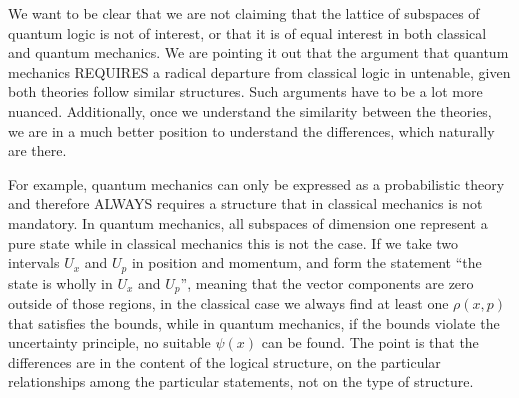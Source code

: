 \documentclass[11pt, executivepaper]{article}
\begin{document}
We want to be clear that we are not claiming that the lattice of subspaces of quantum logic is not of interest, or that it is of equal interest in both classical and quantum mechanics. We are pointing it out that the argument that quantum mechanics REQUIRES a radical departure from classical logic in untenable, given both theories follow similar structures. Such arguments have to be a lot more nuanced. Additionally, once we understand the similarity between the theories, we are in a much better position to understand the differences, which naturally are there.

For example, quantum mechanics can only be expressed as a probabilistic theory and therefore ALWAYS requires a structure that in classical mechanics is not mandatory. In quantum mechanics, all subspaces of dimension one represent a pure state while in classical mechanics this is not the case. If we take two intervals $U_x$ and $U_p$ in position and momentum, and form the statement ``the state is wholly in $U_x$ and $U_p$'', meaning that the vector components are zero outside of those regions, in the classical case we always find at least one $\rho(x,p)$ that satisfies the bounds, while in quantum mechanics, if the bounds violate the uncertainty principle, no suitable $\psi(x)$ can be found. The point is that the differences are in the content of the logical structure, on the particular relationships among the particular statements, not on the type of structure.
\end{document}
